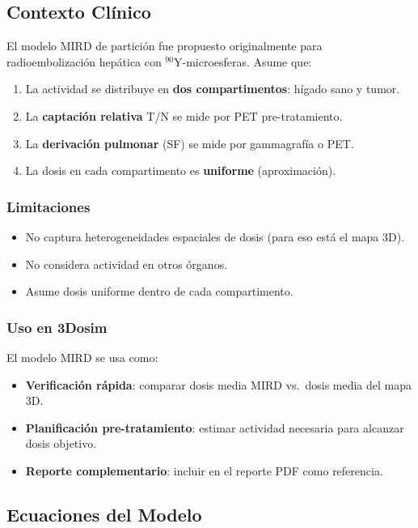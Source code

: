 \documentclass[12pt,a4paper]{article}
\begin{document}
\subsection{Contexto Clínico}

El modelo MIRD de partición fue propuesto originalmente para radioembolización hepática con $^{90}$Y-microesferas. Asume que:

\begin{enumerate}
  \item La actividad se distribuye en \textbf{dos compartimentos}: hígado sano y tumor.
  \item La \textbf{captación relativa} T/N se mide por PET pre-tratamiento.
  \item La \textbf{derivación pulmonar} (SF) se mide por gammagrafía o PET.
  \item La dosis en cada compartimento es \textbf{uniforme} (aproximación).
\end{enumerate}

\subsubsection{Limitaciones}

\begin{itemize}
  \item No captura heterogeneidades espaciales de dosis (para eso está el mapa 3D).
  \item No considera actividad en otros órganos.
  \item Asume dosis uniforme dentro de cada compartimento.
\end{itemize}

\subsubsection{Uso en 3Dosim}

El modelo MIRD se usa como:
\begin{itemize}
  \item \textbf{Verificación rápida}: comparar dosis media MIRD vs.\ dosis media del mapa 3D.
  \item \textbf{Planificación pre-tratamiento}: estimar actividad necesaria para alcanzar dosis objetivo.
  \item \textbf{Reporte complementario}: incluir en el reporte PDF como referencia.
\end{itemize}

\subsection{Ecuaciones del Modelo}
\end{document}
